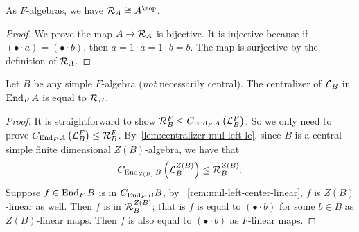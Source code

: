  \begin{lemma}
   As $F$-algebras, we have $\McR_{A}\cong A^{\mop}$. \leanok
 \end{lemma}
 \begin{proof}
   We prove the map $A \to \mathcal{R}_{A}$ is bijective. It is injective because if
   $\left(\bullet \cdot a\right) = \left(\bullet\cdot b\right)$, then
   $a = 1 \cdot a = 1 \cdot b = b$. The map is surjective by the definition of
   $\mathcal{R}_{A}$.
 \end{proof}
 \begin{lemma}\label{lem:centralizer-mul-left-eq-mul-right}
   Let $B$ be any simple $F$-algebra ({\em not\/} necessarily central). The
   centralizer of $\mathcal{L}_{B}$ in $\operatorname{End}_{F}A$ is equal to $\mathcal{R}_{B}$. \leanok
 \end{lemma}
 \begin{proof}
   It is straightforward to show
   $\mathcal{R}_{B}^{F}\le C_{\operatorname{End}_{F}A}\left(\mathcal{L}_{B}^{F}\right)$. So we only need to
   prove $C_{\operatorname{End}_{F}A}\left(\mathcal{L}_{B}^{F}\right)\le \mathcal{R}_{B}^{F}$.
   By~\cref{lem:centralizer-mul-left-le}, since $B$ is a central simple finite
   dimensional $Z(B)$-algebra, we have that
   \[
     C_{\operatorname{End}_{Z(B)}B}\left(\mathcal{L}_{B}^{Z(B)}\right) \le \mathcal{R}_{B}^{Z(B)}.
   \]
   Suppose $f\in\operatorname{End}_{F}B$ is in $C_{\operatorname{End}_{F}B}B$, by
   ~\cref{rem:mul-left-center-linear}, $f$ is $Z(B)$-linear as well. Then $f$ is
   in $\mathcal{R}_{B}^{Z(B)}$; that is $f$ is equal to $\left(\bullet\cdot b\right)$
   for some $b \in B$ as $Z(B)$-linear maps. Then $f$ is also equal to
   $\left(\bullet\cdot b\right)$ as $F$-linear maps.
 \end{proof}

 \begin{construction}

 \end{construction}
 
